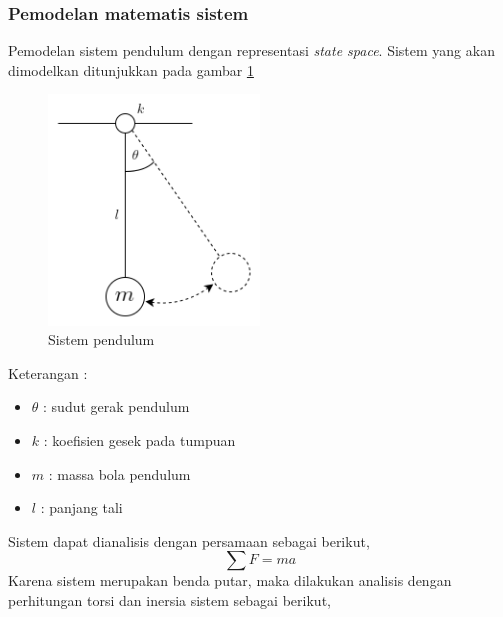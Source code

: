 \documentclass[../cover.tex]{subfiles}
\begin{document}
        \subsubsection{Pemodelan matematis sistem}
            Pemodelan sistem pendulum  dengan representasi \textit{state space}. Sistem yang akan dimodelkan ditunjukkan pada gambar \ref{gambar_1}
                \begin{figure}[H]
                    \centering
                    \includegraphics[width = 0.5\textwidth]{assets/image/soal_1.png}
                    \caption{Sistem pendulum}
                    \label{gambar_1}
                \end{figure}
            \begin{center}
            Keterangan :
                \begin{minipage}[c]{8cm}
                    \begin{itemize}
                        \item $\theta$ : sudut gerak pendulum
                        \item $k$ : koefisien gesek pada tumpuan
                        \item $m$ : massa bola pendulum
                        \item $l$ : panjang tali
                    \end{itemize}
                \end{minipage}
            \end{center}
            Sistem dapat dianalisis dengan persamaan sebagai berikut,
            \begin{equation}
                \sum F = ma
                \label{persamaan_1}
            \end{equation}
            Karena sistem merupakan benda putar, maka dilakukan analisis dengan perhitungan torsi dan inersia sistem sebagai berikut,
\end{document}
